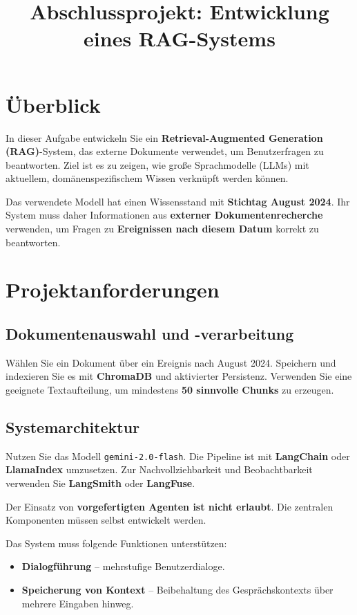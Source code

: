 \documentclass[12pt]{article}
\title{\textbf{Abschlussprojekt: Entwicklung eines RAG-Systems}}
\author{}
\date{}
\begin{document}
\maketitle

\section*{Überblick}

In dieser Aufgabe entwickeln Sie ein \textbf{Retrieval-Augmented Generation (RAG)}-System, das externe Dokumente verwendet, um Benutzerfragen zu beantworten. Ziel ist es zu zeigen, wie große Sprachmodelle (LLMs) mit aktuellem, domänenspezifischem Wissen verknüpft werden können.

Das verwendete Modell hat einen Wissensstand mit \textbf{Stichtag August 2024}. Ihr System muss daher Informationen aus \textbf{externer Dokumentenrecherche} verwenden, um Fragen zu \textbf{Ereignissen nach diesem Datum} korrekt zu beantworten.

\section*{Projektanforderungen}

\subsection*{Dokumentenauswahl und -verarbeitung}
Wählen Sie ein Dokument über ein Ereignis nach August 2024. Speichern und indexieren Sie es mit \textbf{ChromaDB} und aktivierter Persistenz. Verwenden Sie eine geeignete Textaufteilung, um mindestens \textbf{50 sinnvolle Chunks} zu erzeugen.

\subsection*{Systemarchitektur}
Nutzen Sie das Modell \texttt{gemini-2.0-flash}. Die Pipeline ist mit \textbf{LangChain} oder \textbf{LlamaIndex} umzusetzen. Zur Nachvollziehbarkeit und Beobachtbarkeit verwenden Sie \textbf{LangSmith} oder \textbf{LangFuse}.

Der Einsatz von \textbf{vorgefertigten Agenten ist nicht erlaubt}. Die zentralen Komponenten müssen selbst entwickelt werden.

Das System muss folgende Funktionen unterstützen:
\begin{itemize}[noitemsep]
  \item \textbf{Dialogführung} – mehrstufige Benutzerdialoge.
  \item \textbf{Speicherung von Kontext} – Beibehaltung des Gesprächskontexts über mehrere Eingaben hinweg.
\end{itemize}
\end{document}
